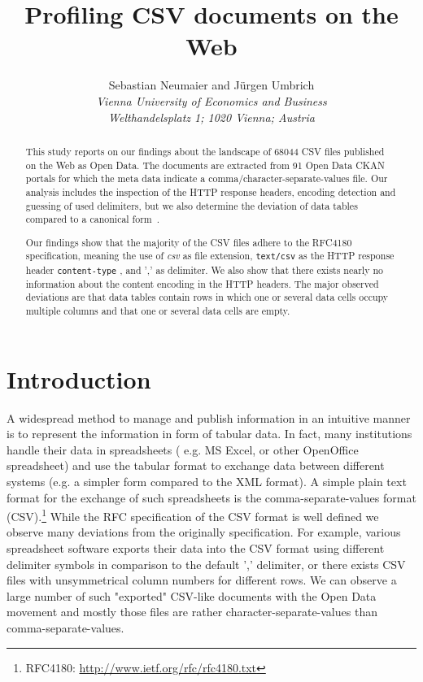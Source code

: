 \documentclass{scrartcl}
\title{Profiling CSV documents on the Web}
\subtitle{}
\author{Sebastian Neumaier and J\"urgen Umbrich \\\textit{Vienna University of Economics and Business}\\ \textit{Welthandelsplatz 1; 1020 Vienna; Austria}}
\date{}
\begin{document}
\maketitle
\begin{abstract}
This study reports on our findings about the landscape of 68044 CSV files published on the Web as Open Data.
The documents are extracted from 91 Open Data CKAN portals for which the meta data indicate a comma/character-separate-values file.
Our analysis includes the inspection of the HTTP response headers, encoding detection and guessing of used delimiters, but we also determine the deviation of data tables compared to a canonical form~\cite{ermilov:2013aa}.

Our findings show that the majority of the CSV files adhere to the RFC4180 specification, meaning the use of \textit{csv} as file extension, \texttt{text/csv} as the HTTP response header \texttt{content-type} , and ',' as delimiter.
We also show that there exists nearly no information about the content encoding in the HTTP headers.
The major observed deviations are that data tables contain rows in which one or several data cells occupy multiple columns and that one or several data cells are empty.

\end{abstract}
\newpage

\tableofcontents
\newpage
\section{Introduction}
A widespread method to manage and publish information in an intuitive manner is to represent the information in form of tabular data.
In fact, many institutions handle their data in spreadsheets ( e.g. MS Excel, or other OpenOffice spreadsheet) and use the tabular format to exchange data between different systems (e.g. a simpler form compared to the XML format).
A simple plain text format for the exchange of such spreadsheets is the comma-separate-values format (CSV).\footnote{RFC4180: \url{http://www.ietf.org/rfc/rfc4180.txt}} 
While the RFC specification of the CSV format is well defined
we observe many deviations from the originally specification. 
For example, various spreadsheet software exports their data into the CSV format using different delimiter symbols in comparison to the default ',' delimiter, or there exists CSV files with unsymmetrical column numbers for different rows. 
We can observe a large number of such "exported" CSV-like documents with the Open Data movement and mostly those files are rather character-separate-values than comma-separate-values.
\end{document}
